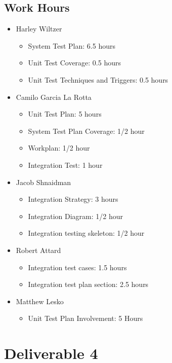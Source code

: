 \documentclass[12pt]{article}
\begin{document}
 \subsection{Work Hours}
%
 \begin{itemize}
     \item Harley Wiltzer
 		\begin{itemize}
 			\item System Test Plan: 6.5 hours
			\item Unit Test Coverage: 0.5 hours
			\item Unit Test Techniques and Triggers: 0.5 hours
 		\end{itemize}
     \item Camilo Garcia La Rotta
 		\begin{itemize}
 			\item Unit Test Plan: 5 hours
 			\item System Test Plan Coverage: 1/2 hour
 			\item Workplan: 1/2 hour
 			\item Integration Test: 1 hour
 		\end{itemize}
     \item Jacob Shnaidman
     \begin{itemize}
         \item Integration Strategy: 3 hours
	 \item Integration Diagram: 1/2 hour
	 \item Integration testing skeleton: 1/2 hour
     \end{itemize}
     \item Robert Attard
     \begin{itemize}
     	\item Integration test cases: 1.5 hours
        \item Integration test plan section: 2.5 hours
     \end{itemize}
     \item Matthew Lesko
     \begin{itemize}
     	\item Unit Test Plan Involvement: 5 Hours
     \end{itemize}
 \end{itemize}
 
 \newpage

 \section{Deliverable 4}
\end{document}
